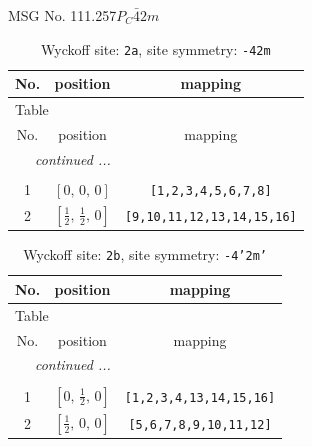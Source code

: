 \documentclass[fleqn,8pt]{jsarticle}
\begin{document}
\setcounter{MaxMatrixCols}{32}

\renewcommand{\tablename}{Table~}
\renewcommand{\figurename}{Figure~}
\begin{center}
\LARGE
MSG No. 111.257\quad$P_{C}\bar{4}2m$
\end{center}
\renewcommand{\arraystretch}{1.2}
\begin{longtable}{ccc}
\caption{Wyckoff site: {\tt 2a}, site symmetry: {\tt -42m}}
 \\
 \hline \hline
No. & position & mapping \\ \hline \endfirsthead

\multicolumn{2}{l}{\tablename\ \thetable{}} \\
 \hline \hline
No. & position & mapping \\ \hline \endhead

 \hline \hline
\multicolumn{2}{r}{\footnotesize\it continued ...} \\ \endfoot

 \hline \hline
\multicolumn{2}{r}{} \\ \endlastfoot

1 & $\left[ 0,\, 0,\, 0 \right]$ & {\tt [1,2,3,4,5,6,7,8]} \\ \hline
2 & $\left[ \frac{1}{2},\, \frac{1}{2},\, 0 \right]$ & {\tt [9,10,11,12,13,14,15,16]} \\
\end{longtable}
\renewcommand{\arraystretch}{1.2}
\begin{longtable}{ccc}
\caption{Wyckoff site: {\tt 2b}, site symmetry: {\tt -4'2m'}}
 \\
 \hline \hline
No. & position & mapping \\ \hline \endfirsthead

\multicolumn{2}{l}{\tablename\ \thetable{}} \\
 \hline \hline
No. & position & mapping \\ \hline \endhead

 \hline \hline
\multicolumn{2}{r}{\footnotesize\it continued ...} \\ \endfoot

 \hline \hline
\multicolumn{2}{r}{} \\ \endlastfoot

1 & $\left[ 0,\, \frac{1}{2},\, 0 \right]$ & {\tt [1,2,3,4,13,14,15,16]} \\ \hline
2 & $\left[ \frac{1}{2},\, 0,\, 0 \right]$ & {\tt [5,6,7,8,9,10,11,12]} \\
\end{longtable}
\end{document}
